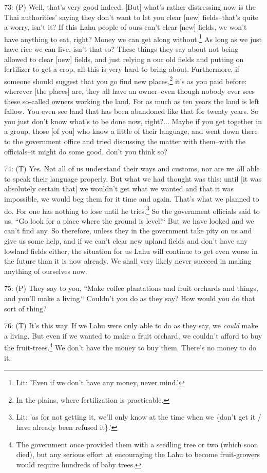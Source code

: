 73: (P) Well, that's very good indeed. [But] what's rather distressing now is the
Thai authorities' saying they don't want to let you clear [new] fields--that's
quite a worry, isn't it? If this Lahu people of ours can't clear [new] fields,
we won't have anything to eat, right? Money we can get along without.\footnote{Lit: 'Even if we don't have any money, never mind.'} As long
as we just have rice we can live, isn't that so? These things they say about not
being allowed to clear [new] fields, and just relying n our old fields and putting
on fertilizer to get a crop, all this is very hard to bring about. Furthermore,
if someone should suggest that you go find new places,\footnote{In the plains, where fertilization is practicable.} it's as you paid before:
wherever [the places] are, they all have an owner--even though nobody ever sees
these so-called owners working the land. For as much as ten years the land is left
fallow. You even see land that has been abandoned like that for twenty years. So
you just don't know what's to be done now, right?... Maybe if you get together
in a group, those [of you] who know a little of their language, and went down there
to the government office and tried discussing the matter with them--with the officials--it
might do some good, don't you think so?

74: (T) Yes. Not all of us understand their ways and customs, nor are we all able
to speak their language properly. But what we had thought was this: until [it was
absolutely certain that] we wouldn't get what we wanted and that it was impossible,
we would beg them for it time and again. That's what we planned to do. For one
has nothing to lose until he tries.\footnote{Lit: 'as for not getting it, we'll only know at the time when we \{don't get it / have already been refused it\}.'} So the government officials said to us,
``Go look for a place where the ground is level!`` But we have
looked and we can't find any. So therefore, unless they in the government take
pity on us and give us some help, and if we can't clear new upland fields and don't
have any lowland fields either, the situation for us Lahu will continue to get
even worse in the future than it is now already. We shall very likely never succeed
in making anything of ourselves now.

75: (P) They say to you, ``Make coffee plantations and fruit orchards and
things, and you'll make a living.`` Couldn't you do as they say? How would
you do that sort of thing?

76: (T) It's this way. If we Lahu were only able to do as they say, we \textit{could}
make a living. But even if we wanted to make a fruit orchard, we couldn't afford
to buy the fruit-trees.\footnote{The government once provided them with a seedling tree or two (which soon died), but any serious effort at encouraging the Lahu to become fruit-growers would require hundreds of baby trees.} We don't have the money to buy them. There's no money
to do it.

